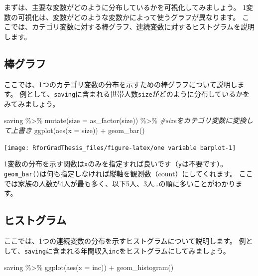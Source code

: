 \documentclass[
]{book}
\newenvironment{Shaded}{\begin{snugshade}}{\end{snugshade}}
\newcommand{\AttributeTok}[1]{\textcolor[rgb]{0.77,0.63,0.00}{#1}}
\newcommand{\CommentTok}[1]{\textcolor[rgb]{0.56,0.35,0.01}{\textit{#1}}}
\newcommand{\FunctionTok}[1]{\textcolor[rgb]{0.00,0.00,0.00}{#1}}
\newcommand{\NormalTok}[1]{#1}
\newcommand{\SpecialCharTok}[1]{\textcolor[rgb]{0.00,0.00,0.00}{#1}}
\begin{document}
まずは、主要な変数がどのように分布しているかを可視化してみましょう。
1変数の可視化は、変数がどのような変数かによって使うグラフが異なります。
ここでは、カテゴリ変数に対する棒グラフ、連続変数に対するヒストグラムを説明します。

\hypertarget{ux68d2ux30b0ux30e9ux30d5}{%
\subsection{棒グラフ}\label{ux68d2ux30b0ux30e9ux30d5}}

ここでは、1つのカテゴリ変数の分布を示すための棒グラフについて説明します。
例として、\texttt{saving}に含まれる世帯人数\texttt{size}がどのように分布しているかをみてみましょう。

\begin{Shaded}
\begin{Highlighting}[]
\NormalTok{saving }\SpecialCharTok{\%\textgreater{}\%}
  \FunctionTok{mutate}\NormalTok{(}\AttributeTok{size =} \FunctionTok{as\_factor}\NormalTok{(size)) }\SpecialCharTok{\%\textgreater{}\%} \CommentTok{\#sizeをカテゴリ変数に変換して上書き}
  \FunctionTok{ggplot}\NormalTok{(}\FunctionTok{aes}\NormalTok{(}\AttributeTok{x =}\NormalTok{ size)) }\SpecialCharTok{+}
  \FunctionTok{geom\_bar}\NormalTok{()}
\end{Highlighting}
\end{Shaded}

\begin{center}\texttt{[image: RforGradThesis\_files/figure-latex/one variable barplot-1]} \end{center}

1変数の分布を示す関数は\texttt{x}のみを指定すれば良いです（\texttt{y}は不要です）。
\texttt{geom\_bar()}は何も指定しなければ縦軸を観測数（count）にしてくれます。
ここでは家族の人数が4人が最も多く、以下5人、3人\ldots の順に多いことがわかります。

\hypertarget{ux30d2ux30b9ux30c8ux30b0ux30e9ux30e0}{%
\subsection{ヒストグラム}\label{ux30d2ux30b9ux30c8ux30b0ux30e9ux30e0}}

ここでは、1つの連続変数の分布を示すヒストグラムについて説明します。
例として、\texttt{saving}に含まれる年間収入\texttt{inc}をヒストグラムにしてみましょう。

\begin{Shaded}
\begin{Highlighting}[]
\NormalTok{saving }\SpecialCharTok{\%\textgreater{}\%}
  \FunctionTok{ggplot}\NormalTok{(}\FunctionTok{aes}\NormalTok{(}\AttributeTok{x =}\NormalTok{ inc)) }\SpecialCharTok{+}
  \FunctionTok{geom\_histogram}\NormalTok{()}
\end{Highlighting}
\end{Shaded}
\end{document}
